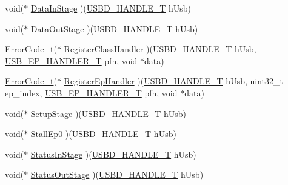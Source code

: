\begin{DoxyCompactItemize}
\item 
void($\ast$ \hyperlink{structUSBD__CORE__API_abe1068288a0eb073f7c9eee1466d4fae}{Data\+In\+Stage} )(\hyperlink{group__USBD__Core_gafdbb2204d929cb9d75736bd2b42342ac}{U\+S\+B\+D\+\_\+\+H\+A\+N\+D\+L\+E\+\_\+T} h\+Usb)
\item 
void($\ast$ \hyperlink{structUSBD__CORE__API_ac4232f616e5ec409d0ca853bf704175f}{Data\+Out\+Stage} )(\hyperlink{group__USBD__Core_gafdbb2204d929cb9d75736bd2b42342ac}{U\+S\+B\+D\+\_\+\+H\+A\+N\+D\+L\+E\+\_\+T} h\+Usb)
\item 
\hyperlink{error_8h_a905255056c349318139d94aa4523d516}{Error\+Code\+\_\+t}($\ast$ \hyperlink{structUSBD__CORE__API_abae19ffbccf70d251c1bdc64aefa3bc7}{Register\+Class\+Handler} )(\hyperlink{group__USBD__Core_gafdbb2204d929cb9d75736bd2b42342ac}{U\+S\+B\+D\+\_\+\+H\+A\+N\+D\+L\+E\+\_\+T} h\+Usb, \hyperlink{group__USBD__Core_gaa578d29a85226108ef62c6d5c325b742}{U\+S\+B\+\_\+\+E\+P\+\_\+\+H\+A\+N\+D\+L\+E\+R\+\_\+T} pfn, void $\ast$data)
\item 
\hyperlink{error_8h_a905255056c349318139d94aa4523d516}{Error\+Code\+\_\+t}($\ast$ \hyperlink{structUSBD__CORE__API_aae115addea44c865ee6e474740a9cf80}{Register\+Ep\+Handler} )(\hyperlink{group__USBD__Core_gafdbb2204d929cb9d75736bd2b42342ac}{U\+S\+B\+D\+\_\+\+H\+A\+N\+D\+L\+E\+\_\+T} h\+Usb, uint32\+\_\+t ep\+\_\+index, \hyperlink{group__USBD__Core_gaa578d29a85226108ef62c6d5c325b742}{U\+S\+B\+\_\+\+E\+P\+\_\+\+H\+A\+N\+D\+L\+E\+R\+\_\+T} pfn, void $\ast$data)
\item 
void($\ast$ \hyperlink{structUSBD__CORE__API_abf9196752dcf110a13c44a14b368e4be}{Setup\+Stage} )(\hyperlink{group__USBD__Core_gafdbb2204d929cb9d75736bd2b42342ac}{U\+S\+B\+D\+\_\+\+H\+A\+N\+D\+L\+E\+\_\+T} h\+Usb)
\item 
void($\ast$ \hyperlink{structUSBD__CORE__API_a8ee40b044bb1327607dbb4185b2b7c93}{Stall\+Ep0} )(\hyperlink{group__USBD__Core_gafdbb2204d929cb9d75736bd2b42342ac}{U\+S\+B\+D\+\_\+\+H\+A\+N\+D\+L\+E\+\_\+T} h\+Usb)
\item 
void($\ast$ \hyperlink{structUSBD__CORE__API_a9b57a8360ef4b3acd63ede5773813b36}{Status\+In\+Stage} )(\hyperlink{group__USBD__Core_gafdbb2204d929cb9d75736bd2b42342ac}{U\+S\+B\+D\+\_\+\+H\+A\+N\+D\+L\+E\+\_\+T} h\+Usb)
\item 
void($\ast$ \hyperlink{structUSBD__CORE__API_aefbfebfc97c53ff2d5030fdd44dbec7e}{Status\+Out\+Stage} )(\hyperlink{group__USBD__Core_gafdbb2204d929cb9d75736bd2b42342ac}{U\+S\+B\+D\+\_\+\+H\+A\+N\+D\+L\+E\+\_\+T} h\+Usb)
\end{DoxyCompactItemize}


